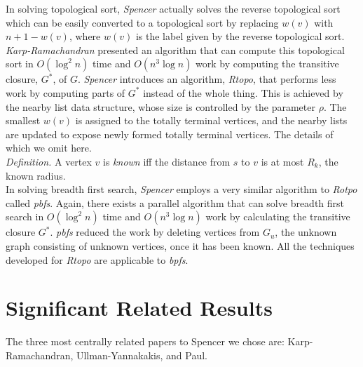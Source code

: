\documentclass[paper=a4, fontsize=11pt]{scrartcl} %
\numberwithin{equation}{section} %
\numberwithin{figure}{section} %
\numberwithin{table}{section} %
\begin{document}
In solving topological sort, \textit{Spencer\cite{S97}} actually solves the reverse topological sort which can be easily converted to a topological sort by replacing $w(v)$ with $n + 1 - w(v)$, where $w(v)$ is the label given by the reverse topological sort. \textit{Karp-Ramachandran\cite{KR90}} presented an algorithm that can compute this topological sort in $O(\log^2{n})$ time and $O(n^3\log{n})$ work by computing the transitive closure, $G^*$, of $G$. \textit{Spencer\cite{S97}} introduces an algorithm, \textit{Rtopo}, that performs less work by computing parts of $G^*$ instead of the whole thing. This is achieved by the nearby list data structure, whose size is controlled by the parameter $\rho$. The smallest $w(v)$ is assigned to the totally terminal vertices, and the nearby lists are updated to expose newly formed totally terminal vertices. The details of which we omit here.\\   

\textit{Definition.} A vertex $v$ is \textit{known} iff the distance from $s$ to $v$ is at most $R_k$, the known radius.\\

In solving breadth first search, \textit{Spencer\cite{S97}} employs a very similar algorithm to \textit{Rotpo} called \textit{pbfs}. Again, there exists a parallel algorithm that can solve breadth first search in $O(\log^2{n})$ time and $O(n^3\log{n})$ work by calculating the transitive closure $G^*$. \textit{pbfs} reduced the work by deleting vertices from $G_u$, the unknown graph consisting of unknown vertices, once it has been known. All the techniques developed for \textit{Rtopo} are applicable to \textit{bpfs}. 


\section{Significant Related Results}

The three most centrally related papers to Spencer we chose are: Karp-Ramachandran, Ullman-Yannakakis, and Paul.
\end{document}
